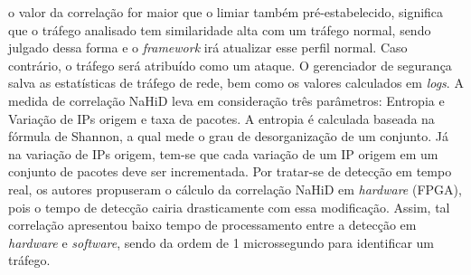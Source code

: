 o  valor da correlação for maior que o limiar também pré-estabelecido, significa que o tráfego analisado tem similaridade alta com um tráfego normal, sendo julgado dessa forma e o \textit{framework} irá atualizar esse perfil normal. Caso contrário, o tráfego será atribuído como um ataque. O gerenciador de segurança  salva as estatísticas de tráfego de rede, bem como os valores calculados em \textit{logs}. A medida de correlação NaHiD leva em consideração três parâmetros: Entropia e Variação de IPs origem e taxa de pacotes. A entropia é calculada baseada na fórmula de Shannon, a qual mede o grau de desorganização de um conjunto. Já na variação de IPs origem, tem-se que cada variação de um IP origem em um conjunto de pacotes deve ser incrementada. Por tratar-se de detecção em tempo real, os autores propuseram o cálculo da correlação NaHiD em \textit{hardware} (FPGA), pois o tempo de detecção cairia drasticamente com essa modificação. Assim, tal correlação apresentou baixo tempo de processamento entre a detecção em \textit{hardware} e \textit{software}, sendo da ordem de 1 microssegundo para identificar um tráfego.  
 


   

